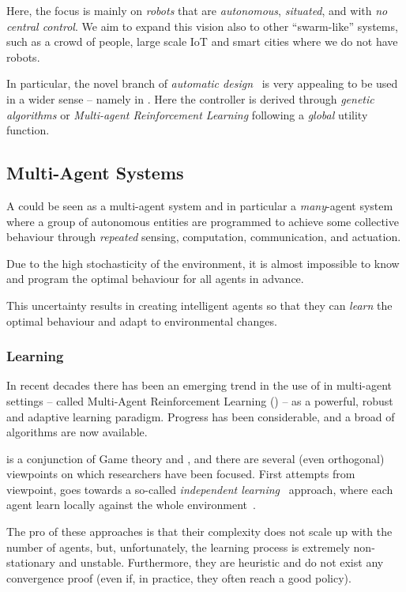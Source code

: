 \documentclass[11pt]{article}
\begin{document}
Here, the focus is mainly on \textit{robots} that are \emph{autonomous}, \emph{situated}, and with \emph{no central control}. We aim to expand this vision also to other ``swarm-like'' systems, such as a crowd of people, large scale IoT and smart cities where we do not have robots. 

In particular, the novel branch of \textit{automatic design}~\cite{DBLP:journals/firai/FrancescaB16} is very appealing to be used in a wider sense -- namely in \cpsw{}. Here the controller is derived through \textit{genetic algorithms} or \textit{Multi-agent Reinforcement Learning} following a \textit{global} utility function. 
\subsection{Multi-Agent Systems}
A \cpsw{} could be seen as a multi-agent system and in particular a \emph{many}-agent system where a group of autonomous entities are programmed to achieve some collective behaviour through \emph{repeated} sensing, computation, communication, and actuation.

Due to the high stochasticity of the environment, it is almost impossible to know and program the optimal behaviour for all agents in advance.

This uncertainty results in creating intelligent agents so that they can \emph{learn} the optimal behaviour and adapt to environmental changes.
\subsubsection{Learning}
In recent decades there has been an emerging trend in the use of \rl{} 
in multi-agent settings -- called Multi-Agent Reinforcement Learning (\marl{}) -- as a powerful, robust and adaptive learning paradigm.
%
Progress has been considerable, and a broad of algorithms are now available.

\marl{} is a conjunction of Game theory and \rl{}, 
 and there are several (even orthogonal) viewpoints on which researchers have been focused.
First attempts from \rl{} viewpoint, 
 goes towards a so-called \textit{independent learning}~\cite{DBLP:journals/tsmc/BusoniuBS08} approach, where each agent learn locally against the whole environment~\cite{DBLP:conf/icml/Tan93}.

The pro of these approaches is that their complexity does not scale up with the number of agents, 
 but, unfortunately, the learning process is extremely non-stationary and unstable.
% 
Furthermore, they are heuristic and do not exist any convergence proof (even if, in practice, they often reach a good policy).
\end{document}
